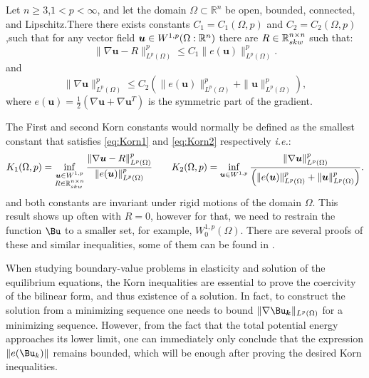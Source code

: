 \begin{theorem} \label{KornGeneralDomain}
     Let $n \geq 3$,$1<p<\infty$, and let the domain $\Omega \subset \mathbb{R}^n$ be open, bounded, connected, and Lipschitz.There there exists constants $C_1=C_1(\Omega,p)$ and $C_2=C_2(\Omega,p)$,such that for any vector field $\boldsymbol{u} \in W^{1,p}(\Omega:\mathbb{R}^n)$ there are $R\in\mathbb{R}^{n\times n}_{skw}$ such that:
        \begin{equation}
        \label{eq:Korn1}
        \|\nabla \boldsymbol{u}-R\|_{L^p(\Omega)}^p \leq C_1\|e(\boldsymbol{u})\|_{L^p(\Omega)}^p .
        \end{equation}
        and
        \begin{equation}
        \label{eq:Korn2}
        \|\nabla \boldsymbol{u}\|_{L^p(\Omega)}^p \leq C_2\left(\|e(\boldsymbol{u})\|_{L^p(\Omega)}^p+\|\boldsymbol{u}\|_{L^p(\Omega)}^p\right),
        \end{equation}
    where $e(\boldsymbol{u})=\frac{1}{2}\left(\nabla \boldsymbol{u}+\nabla \boldsymbol{u}^T\right)$ is the symmetric part of the gradient. 
\end{theorem}
The First and second Korn constants would normally be defined as the smallest constant that satisfies \ref{eq:Korn1} and \ref{eq:Korn2} respectively  \textit{i.e.}:
\begin{equation}
    \label{eq:KornConstant}
    K_1(\Omega,p)=\inf_{\substack{\boldsymbol{u} \in W^{1,p} \\ R \in \mathbb{R}^{n\times n}_{skw}}}
    \frac{\|\nabla \boldsymbol{u}-R\|_{L^p(\Omega)}^p}{\|e(\boldsymbol{u})\|_{L^p(\Omega)}^p} \qquad K_2(\Omega,p)=\inf_{\boldsymbol{u} \in W^{1,p}} \frac{\|\nabla \boldsymbol{u}\|_{L^p(\Omega)}^p}{\left(\|e(\boldsymbol{u})\|_{L^p(\Omega)}^p+\|\boldsymbol{u}\|_{L^p(\Omega)}^p\right)}.
\end{equation}
and both constants are invariant under rigid motions of the domain $\Omega$. This result shows up often with  $R=0$, however for that, we need to restrain the function $\Bu$ to a smaller set, for example, $W^{1,p}_0(\Omega)$.
There are several proofs of these and similar inequalities, some of them can be found in \cite{KohnThesis, KornProof1, KornProof2, conti0, KornProof3}.

When studying boundary-value problems in elasticity and solution of the equilibrium equations, the Korn inequalities are essential to prove the coercivity of the bilinear form, and thus existence of a solution. In fact, to construct the solution from a minimizing sequence one needs to bound $\|\nabla \boldsymbol{\Bu_k}\|_{L^p(\Omega)}$ for a minimizing sequence. However, from the fact that the total
potential energy approaches its lower limit, one can immediately only conclude that the expression $\|e(\Bu_k)\|$ remains bounded, which will be enough after proving the desired Korn inequalities.

